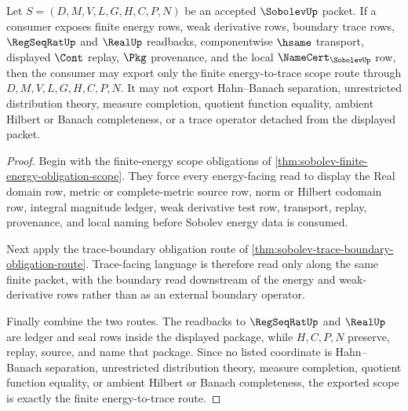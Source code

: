 \begin{theorem}
\label{thm:sobolev-energy-trace-scope-obligation}
Let $S=(D,M,V,L,G,H,C,P,N)$ be an accepted $\SobolevUp$ packet. If a consumer exposes finite energy rows, weak derivative rows, boundary trace rows, $\RegSeqRatUp$ and $\RealUp$ readbacks, componentwise $\hsame$ transport, displayed $\Cont$ replay, $\Pkg$ provenance, and the local $\NameCert_{\SobolevUp}$ row, then the consumer may export only the finite energy-to-trace scope route through $D,M,V,L,G,H,C,P,N$. It may not export Hahn--Banach separation, unrestricted distribution theory, measure completion, quotient function equality, ambient Hilbert or Banach completeness, or a trace operator detached from the displayed packet.
\end{theorem}
\begin{proof}
Begin with the finite-energy scope obligations of \autoref{thm:sobolev-finite-energy-obligation-scope}. They force every energy-facing read to display the Real domain row, metric or complete-metric source row, norm or Hilbert codomain row, integral magnitude ledger, weak derivative test row, transport, replay, provenance, and local naming before Sobolev energy data is consumed.

Next apply the trace-boundary obligation route of \autoref{thm:sobolev-trace-boundary-obligation-route}. Trace-facing language is therefore read only along the same finite packet, with the boundary read downstream of the energy and weak-derivative rows rather than as an external boundary operator.

Finally combine the two routes. The readbacks to $\RegSeqRatUp$ and $\RealUp$ are ledger and seal rows inside the displayed package, while $H,C,P,N$ preserve, replay, source, and name that package. Since no listed coordinate is Hahn--Banach separation, unrestricted distribution theory, measure completion, quotient function equality, or ambient Hilbert or Banach completeness, the exported scope is exactly the finite energy-to-trace route.
\end{proof}
